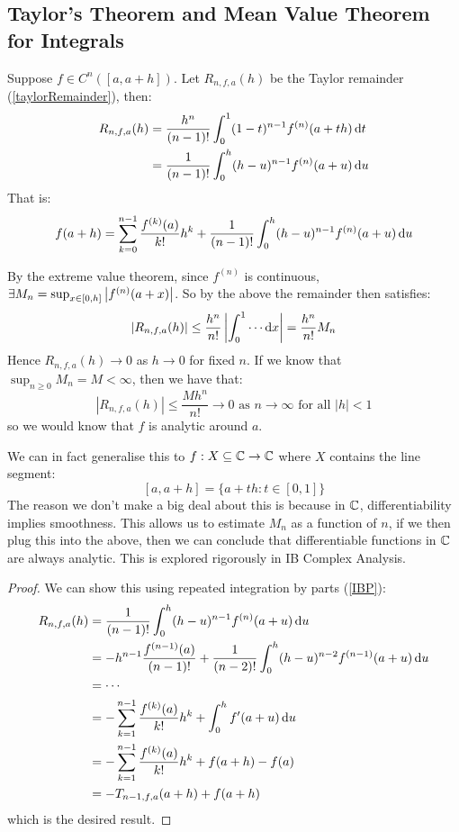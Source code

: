 \documentclass[../main.tex]{subfiles}
\begin{document}
\subsection{Taylor's Theorem and Mean Value Theorem for Integrals}
\begin{theorem}
  Suppose $f \in C^{n}([a, a + h])$.
  Let $R_{n, f, a}(h)$ be the Taylor remainder (\cref{taylorRemainder}), then:
  \begin{align*}
    R_{n, f, a}(h) &= \frac{h^{n}}{(n - 1)!}\int_{0}^{1} (1- t)^{n - 1}f^{(n)}(a + th) \d{t} \\
                   &= \frac{1}{(n - 1)!} \int_{0}^{h} (h - u)^{n - 1}f^{(n)}(a + u) \d{u}
  \end{align*}
  That is:
  \[
    f(a + h) = \sum_{k = 0}^{n - 1} \frac{f^{(k)}(a)}{k!}h^{k} + \frac{1}{(n - 1)!}  \int_{0}^{h} (h - u)^{n - 1} f^{(n)}(a + u) \d{u}
  \]
\end{theorem}
\begin{remark}
  By the extreme value theorem, since $f^{(n)}$ is continuous, $\exists M_n = \sup_{x \in [0, h]} \left\lvert f^{(n)}(a + x) \right\rvert$.
  So by the above the remainder then satisfies:
  \[
    |R_{n, f, a}(h)| \leq \frac{h^{n}}{n!}\abs{\int_{0}^{1} \cdots  \d{x}} = \frac{h^{n}}{n!}M_n
  \]
  Hence $R_{n, f, a}(h) \to 0$ as $h \to 0$ for fixed $n$.
  If we know that $\sup_{n \geq 0} M_n = M < \infty$, then we have that:
  \[
    |R_{n, f, a}(h)| \leq \frac{Mh^{n}}{n!} \to 0 \text{ as }n \to \infty \text{ for all } |h| < 1
  \]
  so we would know that $f$ is analytic around $a$.

  We can in fact generalise this to $f: X \subseteq \mathbb{C} \to \mathbb{C}$ where $X$ contains the line segment:
  \[
    [a, a + h] = \{a + th: t \in [0, 1]\}
  \]
  The reason we don't make a big deal about this is because in $\mathbb{C}$, differentiability implies smoothness.
  This allows us to estimate $M_n$ as a function of $n$, if we then plug this into the above, then we can conclude that differentiable functions in $\mathbb{C}$ are always analytic.
  This is explored rigorously in IB Complex Analysis.
\end{remark}
\begin{proof}
  We can show this using repeated integration by parts (\cref{IBP}):
  \begin{align*}
    R_{n,f,a}(h) &= \frac{1}{(n - 1)!} \int_{0}^{h} (h - u)^{n - 1}f^{(n)}(a + u) \d{u} \\
                 &= - h^{n - 1} \frac{f^{(n - 1)}(a)}{(n - 1)!} + \frac{1}{(n - 2)!}\int_{0}^{h} (h - u)^{n - 2}f^{(n - 1)}(a + u) \d{u} \\
                 &= \cdots  \\
                 &= - \sum_{k = 1}^{n - 1} \frac{f^{(k)}(a)}{k!}h^{k} + \int_{0}^{h} f'(a + u) \d{u} \\
                 &= - \sum_{k = 1}^{n - 1} \frac{f^{(k)}(a)}{k!}h^{k} + f(a + h) - f(a) \\
                 &= -T_{n - 1, f, a}(a + h) + f(a + h)
  \end{align*}
  which is the desired result.
\end{proof}
\end{document}
